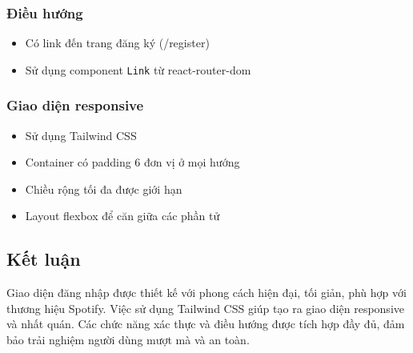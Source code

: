 \subsubsection{Điều hướng}
\begin{itemize}
    \item Có link đến trang đăng ký (/register)
    \item Sử dụng component \texttt{Link} từ react-router-dom
\end{itemize}

\subsubsection{Giao diện responsive}
\begin{itemize}
    \item Sử dụng Tailwind CSS
    \item Container có padding 6 đơn vị ở mọi hướng
    \item Chiều rộng tối đa được giới hạn
    \item Layout flexbox để căn giữa các phần tử
\end{itemize}

\subsection{Kết luận}
Giao diện đăng nhập được thiết kế với phong cách hiện đại, tối giản, phù hợp với thương hiệu Spotify. Việc sử dụng Tailwind CSS giúp tạo ra giao diện responsive và nhất quán. Các chức năng xác thực và điều hướng được tích hợp đầy đủ, đảm bảo trải nghiệm người dùng mượt mà và an toàn. 